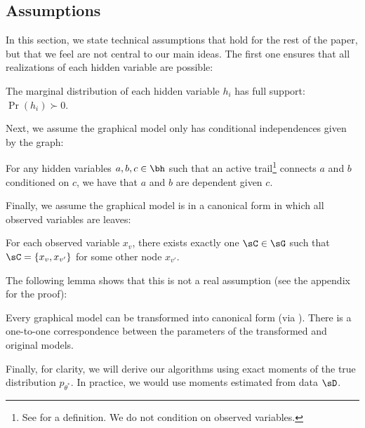 \subsection{Assumptions}

In this section, we state technical assumptions that hold for the rest of the
paper, but that we feel are not central to our main ideas.
The first one ensures that all realizations of each hidden variable are possible:

\begin{assumption}
  \label{asm:non-degeneracy}
  The marginal distribution of each hidden variable $h_i$ has full support: $\Pr(h_i) \succ 0$.
\end{assumption}

Next, we assume the graphical model only has conditional independences given by
the graph:
\begin{assumption}[Faithful]
  \label{asm:faithful}  
  For any hidden variables $a,b,c \in \bh$
  such that an active trail\footnote{See
  \citet{koller2009probabilistic} for a definition.
  We do not condition on observed variables.} connects $a$ and $b$ conditioned on $c$,
  we have that $a$ and $b$ are dependent given $c$. %
\end{assumption}

Finally, we assume the graphical model is in a canonical form
in which all observed variables are leaves:
\begin{assumption}
  \label{asm:canonical}
  For each observed variable $x_v$, there exists exactly one $\sC \in \sG$
  such that $\sC = \{ x_v, x_{v'} \}$ for some other node $x_{v'}$.
\end{assumption}
The following lemma shows that this is not a real assumption (see the appendix for the proof):
\begin{lemma}
\label{lem:reduction}
Every graphical model can be transformed into canonical
form (via ).
There is a one-to-one correspondence between the parameters of the transformed
and original models.
\end{lemma}

Finally, for clarity, we will derive our algorithms using exact moments of the true
distribution $p_{\theta^*}$.  In practice, we would use moments estimated from data $\sD$.

